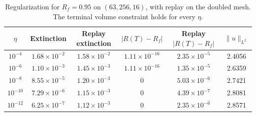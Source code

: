 \begin{table}[tbp]
\caption{Regularization for $R_f=0.95$ on $(63,256,16)$, with replay on the doubled mesh. The terminal volume constraint holds for every $\eta$.}
\label{tab:num_eta}
\centering\footnotesize\setlength{\tabcolsep}{4pt}
\begin{tabular}{cccccc}
\toprule
$\eta$ & Extinction & Replay extinction & $|R(T)-R_f|$ & Replay $|R(T)-R_f|$ & $\|u\|_{L^2}$\\
\midrule
$10^{-4}$ & $1.68\times10^{-2}$ & $1.58\times10^{-2}$ & $1.11\times10^{-16}$ & $2.35\times10^{-5}$ & 2.4056 \\
$10^{-6}$ & $1.10\times10^{-3}$ & $1.45\times10^{-3}$ & $1.11\times10^{-16}$ & $1.35\times10^{-5}$ & 2.6359 \\
$10^{-8}$ & $8.55\times10^{-5}$ & $1.20\times10^{-3}$ & $0$ & $5.03\times10^{-6}$ & 2.7421 \\
$10^{-10}$ & $7.29\times10^{-6}$ & $1.15\times10^{-3}$ & $0$ & $4.39\times10^{-7}$ & 2.8081 \\
$10^{-12}$ & $6.25\times10^{-7}$ & $1.12\times10^{-3}$ & $0$ & $2.35\times10^{-6}$ & 2.8571 \\
\bottomrule
\end{tabular}
\end{table}
